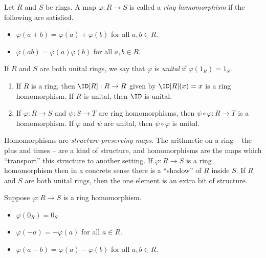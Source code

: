 \documentclass{article}
\begin{document}

\begin{dfn}
Let $R$ and $S$ be rings. A map $\varphi : R \rightarrow S$ is called a \emph{ring homomorphism} if the following are satisfied.
\begin{itemize}
\item $\varphi(a + b) = \varphi(a) + \varphi(b)$ for all $a,b \in R$.
\item $\varphi(ab) = \varphi(a)\varphi(b)$ for all $a,b \in R$.
\end{itemize}

If $R$ and $S$ are both unital rings, we say that $\varphi$ is \emph{unital} if $\varphi(1_R) = 1_S$.
\end{dfn}

\begin{prop} \mbox{}
\begin{enumerate}
\item If $R$ is a ring, then $\ID[R] : R \rightarrow R$ given by $\ID[R](x) = x$ is a ring homomorphism. If $R$ is unital, then $\ID$ is unital.
\item If $\varphi : R \rightarrow S$ and $\psi : S \rightarrow T$ are ring homomorphisms, then $\psi \circ \varphi : R \rightarrow T$ is a homomorphism. If $\varphi$ and $\psi$ are unital, then $\psi \circ \varphi$ is unital.
\end{enumerate}
\end{prop}

Homomorphisms are \emph{structure-preserving maps}. The arithmetic on a ring -- the plus and times -- are a kind of structure, and homomorphisms are the maps which ``transport'' this structure to another setting. If $\varphi : R \rightarrow S$ is a ring homomorphism then in a concrete sense there is a ``shadow'' of $R$ inside $S$. If $R$ and $S$ are both unital rings, then the one element is an extra bit of structure.

\begin{prop}
Suppose $\varphi : R \rightarrow S$ is a ring homomorphism.
\begin{itemize}
\item $\varphi(0_R) = 0_S$
\item $\varphi(-a) = -\varphi(a)$ for all $a \in R$.
\item $\varphi(a-b) = \varphi(a) - \varphi(b)$ for all $a,b \in R$.
\end{itemize}
\end{prop}
\end{document}
